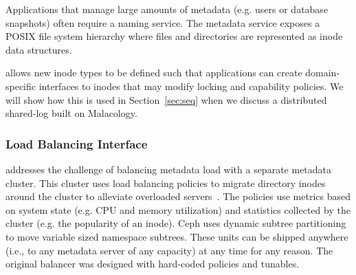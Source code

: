 Applications that manage large amounts of  metadata
(e.g. users or database snapshots) often require a naming service.  The
metadata service exposes a POSIX file system hierarchy where files and
directories are represented as inode data structures.


 allows new inode types
to be defined such that applications can create domain-specific interfaces to
inodes that may modify locking and capability policies. We will show how this
is used in Section~\ref{sec:seq} when we discuss a distributed shared-log built
on Malacology.

 


\subsubsection{Load Balancing Interface}
\label{sec:load-balancing-interface}


addresses the challenge of balancing  metadata
load with a separate metadata cluster. This cluster uses load balancing
policies to migrate directory inodes around the cluster to alleviate overloaded servers~\cite{weil:sc2004-dyn-metadata}.  The policies use metrics
based on system state (e.g.  CPU and memory utilization) and statistics
collected by the cluster (e.g. the popularity of an inode). Ceph uses dynamic
subtree partitioning to move variable sized namespace subtrees. These units can
be shipped anywhere (i.e., to any metadata server of any capacity) at any time
for any reason. The original balancer was designed with hard-coded policies and
tunables.\\

